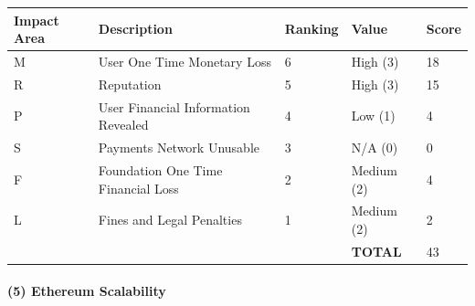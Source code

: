 \documentclass[12pt]{article} %
\begin{document}
{\begin{center}
\begin{tabular}{ | l | l | l | l | l |}
  \hline
  \textbf{Impact Area} & \textbf{Description} & \textbf{Ranking} & \textbf{Value} & \textbf{Score}
  \\ \hline
  M & User One Time Monetary Loss			& 6	& High (3)		& 18
  \\ \hline
  R & Reputation		& 5	& High (3)		& 15
  \\ \hline
  P & User Financial Information Revealed		& 4	& Low (1)		& 4
  \\ \hline
  S & Payments Network Unusable					& 3	& N/A (0)		& 0
  \\ \hline
  F & Foundation One Time Financial Loss	& 2	& Medium (2)	& 4
  \\ \hline
  L & Fines and Legal Penalties						& 1	& Medium (2)	& 2
  \\ \hline
  & & & \textbf{TOTAL} & 43
  \\ \hline
\end{tabular}
\end{center}
\label{tab:severityUserIdsStolenFromBackupSystem}

\paragraph{(5) Ethereum Scalability }

}
\end{document}
